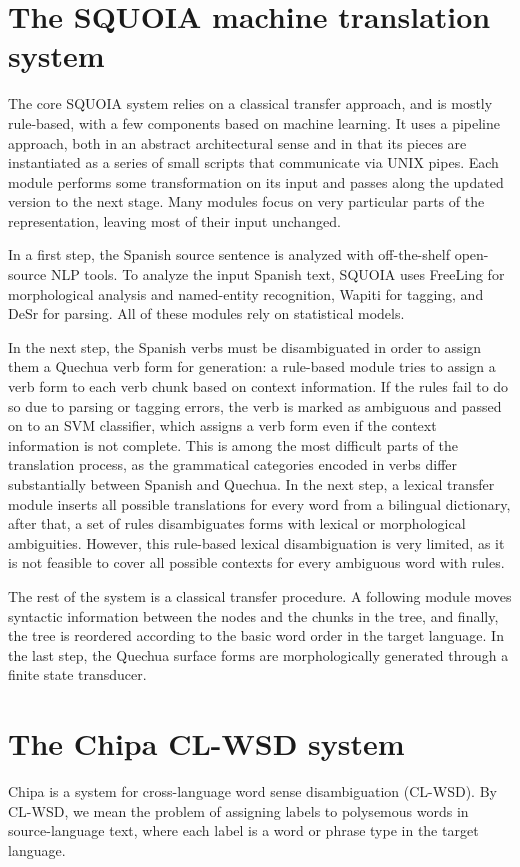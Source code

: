 \documentclass[10pt, a4paper]{article}
\begin{document}
\section{The SQUOIA machine translation system}
The core SQUOIA system relies on a classical transfer approach, and is mostly
rule-based, with a few components based on machine learning.
It uses a pipeline approach, both in an abstract architectural sense and in
that its pieces are instantiated as a series of small scripts that communicate
via UNIX pipes. Each module performs some transformation on its input and
passes along the updated version to the next stage. Many modules focus on very
particular parts of the representation, leaving most of their input unchanged.

In a first step, the Spanish source sentence is analyzed with off-the-shelf
open-source NLP tools. To analyze the input Spanish text,
SQUOIA uses FreeLing \cite{padro12} for morphological analysis and named-entity
recognition,
Wapiti \cite{lavergne2010practical} for tagging,
and DeSr \cite{attardi-EtAl:2007:EMNLP-CoNLL2007} for parsing.
All of these modules rely on statistical models.

In the next step, the Spanish verbs must be disambiguated in order to assign
them a Quechua verb form for generation: a rule-based module tries to assign a
verb form to each verb chunk based on context information. If the rules fail to
do so due to parsing or tagging errors, the verb is marked as ambiguous and
passed on to an SVM classifier, which assigns a verb form even if the context
information is not complete. This is among the most difficult parts of the
translation process, as the grammatical categories encoded in verbs differ
substantially between Spanish and Quechua. In the next step, a lexical transfer
module
inserts all possible translations for every word from a bilingual dictionary,
after that, a set of rules disambiguates forms with lexical or morphological
ambiguities. However, this rule-based lexical disambiguation is very limited,
as it is not feasible to cover all possible contexts for every ambiguous word
with rules.

The rest of the system is a classical transfer procedure. A following module
moves syntactic information between the nodes and the chunks in the tree, and
finally, the tree is reordered according to the basic word order in the target
language. In the last step, the Quechua surface forms are morphologically
generated through a finite state transducer.

\section{The Chipa CL-WSD system}
Chipa is a system for cross-language word sense disambiguation (CL-WSD). By
CL-WSD, we mean the problem of assigning labels to polysemous words in
source-language text, where each label is a word or phrase type in the target
language.
\end{document}
